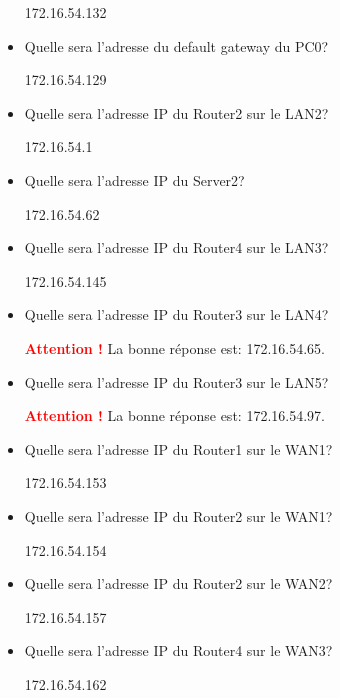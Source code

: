 \documentclass[a4paper]{article}
\begin{document}
\begin{itemize}
\begin{example}
        172.16.54.132
    \end{example}
    \item Quelle sera l'adresse du default gateway du PC0?
    \begin{example}
        172.16.54.129
    \end{example}
    \item Quelle sera l'adresse IP du Router2 sur le LAN2?
    \begin{example}
        172.16.54.1
    \end{example}
    \item Quelle sera l'adresse IP du Server2?
    \begin{example}
        172.16.54.62
    \end{example}
    \item Quelle sera l'adresse IP du Router4 sur le LAN3?
    \begin{example}
        172.16.54.145
    \end{example}
    \item Quelle sera l'adresse IP du Router3 sur le LAN4?
    \begin{example}
        \textcolor{red}{\textbf{Attention !}} La bonne réponse est: 172.16.54.65.
    \end{example}
    \item Quelle sera l'adresse IP du Router3 sur le LAN5?
    \begin{example}
        \textcolor{red}{\textbf{Attention !}} La bonne réponse est: 172.16.54.97.
    \end{example}
    \item Quelle sera l'adresse IP du Router1 sur le WAN1?
    \begin{example}
        172.16.54.153
    \end{example}
    \item Quelle sera l'adresse IP du Router2 sur le WAN1?
    \begin{example}
        172.16.54.154
    \end{example}
    \item Quelle sera l'adresse IP du Router2 sur le WAN2?
    \begin{example}
        172.16.54.157
    \end{example}
    \item Quelle sera l'adresse IP du Router4 sur le WAN3?
    \begin{example}
        172.16.54.162
    \end{example}
\end{itemize}
\end{document}
